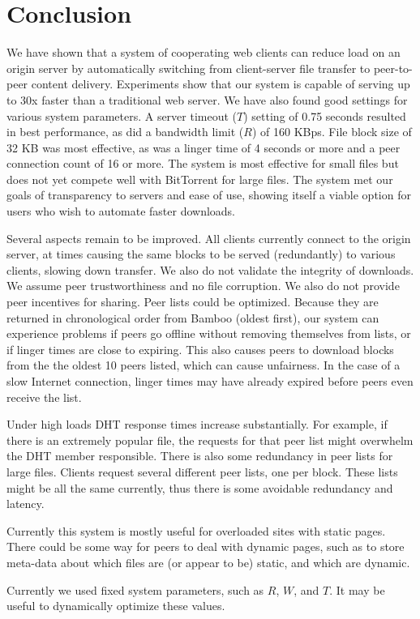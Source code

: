 \chapter{Conclusion}

We have shown that a system of cooperating web clients can reduce load on an origin server by automatically switching
from client-server file transfer to peer-to-peer content delivery. 
Experiments show that our system is capable of serving up to 30x faster than a traditional web server.
We have also found good settings for various system parameters.
A server timeout ($T$) setting of 0.75 seconds resulted in best performance, as did a bandwidth limit ($R$) of 160 KBps.
File block size of 32 KB was most effective, as was a linger time of 4 seconds or more and a peer connection count of 16 or more.
The system is most effective for small files but does not yet compete well with
BitTorrent for large files.  %
The system met our goals of transparency to servers and ease of use, showing itself a viable option for users who wish to automate faster downloads.


Several aspects remain to be improved.  All clients currently connect to the origin
server, at times causing the same blocks to be served (redundantly) to various clients, slowing down transfer.
We also do not validate the integrity of downloads.  We assume peer trustworthiness and no file corruption.  We also do not provide peer incentives for sharing.
Peer lists could be optimized.  Because they are returned in chronological order from Bamboo (oldest first), our system can experience problems if peers
go offline without removing themselves from lists, or if linger times are close to expiring.  This also causes peers to download blocks 
from the the oldest 10 peers listed, which can cause unfairness. In the case of a slow Internet connection, linger times may have
already expired before peers even receive the list.

Under high loads DHT response times increase substantially.  For example, if there is an extremely popular file, the 
requests for that peer list might overwhelm the DHT member responsible.  There is also some redundancy in peer lists for large files.  
Clients request several different peer lists, one per block.  These lists might be all the same currently, thus
there is some avoidable redundancy and latency.

Currently this system is mostly useful for overloaded sites with static pages.  There could be some way for peers to deal with dynamic pages, such as to
store meta-data about which files are (or appear to be) static, and which are dynamic.  

Currently we used fixed system parameters, such as $R$, $W$, and $T$.  It may be useful to dynamically optimize these values.